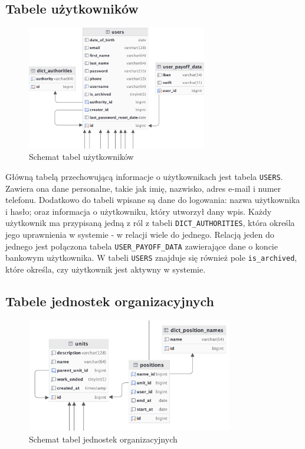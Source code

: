 \subsection{Tabele użytkowników}

\begin{figure}[H]
    \centering
    \includegraphics[width=0.7\textwidth]{graf/usersTable.png}
    \caption{Schemat tabel użytkowników}
    \label{fig:usersTable}
\end{figure}

Główną tabelą przechowującą informacje o użytkownikach jest tabela \texttt{USERS}. Zawiera ona dane personalne, takie jak imię, nazwisko, adres e-mail i numer telefonu. Dodatkowo do tabeli wpisane są dane do logowania: nazwa użytkownika i hasło; oraz informacja o użytkowniku, który  utworzył dany wpis. Każdy użytkownik ma przypisaną jedną z ról z tabeli \texttt{DICT\_AUTHORITIES}, która określa jego uprawnienia w systemie - w relacji wiele do jednego. Relacją jeden do jednego jest połączona tabela \texttt{USER\_PAYOFF\_DATA} zawierające dane o koncie bankowym użytkownika. W tabeli \texttt{USERS} znajduje się również pole \texttt{is\_archived}, które określa, czy użytkownik jest aktywny w systemie.

\subsection{Tabele jednostek organizacyjnych}

\begin{figure}[H]
    \centering
    \includegraphics[width=0.8\textwidth]{graf/unitsTable.png}
    \caption{Schemat tabel jednostek organizacyjnych}
    \label{fig:organizationalUnitsTable}
\end{figure}

